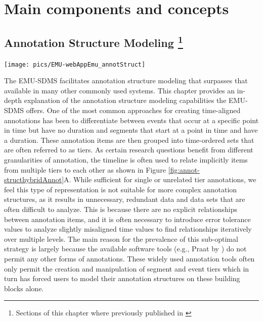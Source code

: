 \documentclass[]{book}
\begin{document}
\hypertarget{part-main-components-and-concepts}{%
\part{Main components and concepts}\label{part-main-components-and-concepts}}

\hypertarget{chap:annot-struct-mod}{%
\chapter[Annotation Structure Modeling ]{\texorpdfstring{Annotation Structure Modeling \footnote{Sections of this chapter where previously published in \citet{winkelmann:2017aa}}}{Annotation Structure Modeling }}\label{chap:annot-struct-mod}}

\begin{center}\texttt{[image: pics/EMU-webAppEmu\_annotStruct]} \end{center}

The EMU-SDMS facilitates annotation structure modeling that surpasses that available in many other commonly used systems. This chapter provides an in-depth explanation of the annotation structure modeling capabilities the EMU-SDMS offers. One of the most common approaches for creating time-aligned annotations has been to differentiate between events that occur at a specific point in time but have no duration and segments that start at a point in time and have a duration. These annotation items are then grouped into time-ordered sets that are often referred to as tiers. As certain research questions benefit from different granularities of annotation, the timeline is often used to relate implicitly items from multiple tiers to each other as shown in Figure \ref{fig:annot-structhybridAnnot}A. While sufficient for single or unrelated tier annotations, we feel this type of representation is not suitable for more complex annotation structures, as it results in unnecessary, redundant data and data sets that are often difficult to analyze. This is because there are no explicit relationships between annotation items, and it is often necessary to introduce error tolerance values to analyze slightly misaligned time values to find relationships iteratively over multiple levels. The main reason for the prevalence of this sub-optimal strategy is largely because the available software tools (e.g., Praat by \citet{boersma:2011a}) do not permit any other forms of annotations. These widely used annotation tools often only permit the creation and manipulation of segment and event tiers which in turn has forced users to model their annotation structures on these building blocks alone.
\end{document}
